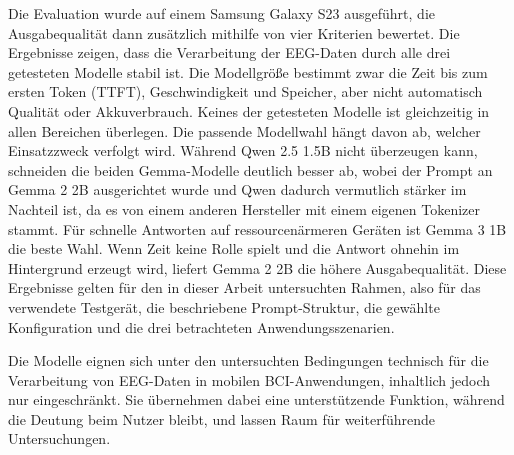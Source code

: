 \noindent Die Evaluation wurde auf einem Samsung Galaxy S23 ausgeführt, die Ausgabequalität dann zusätzlich mithilfe von vier Kriterien bewertet. Die Ergebnisse zeigen, dass die Verarbeitung der EEG-Daten durch alle drei getesteten Modelle stabil ist. Die Modellgröße bestimmt zwar die Zeit bis zum ersten Token (TTFT), Geschwindigkeit und Speicher, aber nicht automatisch Qualität oder Akkuverbrauch. Keines der getesteten Modelle ist gleichzeitig in allen Bereichen überlegen. Die passende Modellwahl hängt davon ab, welcher Einsatzzweck verfolgt wird. Während Qwen 2.5 1.5B nicht überzeugen kann, schneiden die beiden Gemma-Modelle deutlich besser ab, wobei der Prompt an Gemma 2 2B ausgerichtet wurde und Qwen dadurch vermutlich stärker im Nachteil ist, da es von einem anderen Hersteller mit einem eigenen Tokenizer stammt. Für schnelle Antworten auf ressourcenärmeren Geräten ist Gemma 3 1B die beste Wahl. Wenn Zeit keine Rolle spielt und die Antwort ohnehin im Hintergrund erzeugt wird, liefert Gemma 2 2B die höhere Ausgabequalität. Diese Ergebnisse gelten für den in dieser Arbeit untersuchten Rahmen, also für das verwendete Testgerät, die beschriebene Prompt-Struktur, die gewählte Konfiguration und die drei betrachteten Anwendungsszenarien.
\vspace{\baselineskip}

\noindent Die Modelle eignen sich unter den untersuchten Bedingungen technisch für die Verarbeitung von EEG-Daten in mobilen BCI-Anwendungen, inhaltlich jedoch nur eingeschränkt. Sie übernehmen dabei eine unterstützende Funktion, während die Deutung beim Nutzer bleibt, und lassen Raum für weiterführende Untersuchungen.